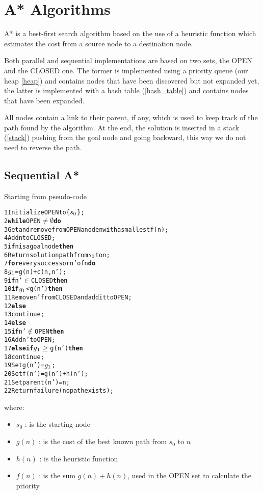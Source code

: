 \section{A* Algorithms}
\label{Sec:implementation}

A* is a best-first search algorithm based on the use of a heuristic function which estimates the cost from a source node to a destination node.

Both parallel and sequential implementations are based on two sets, the OPEN and the CLOSED one. The former is implemented using a priority queue (our heap \ref{heap}) and contains nodes that have been discovered but not expanded yet, the latter is implemented with a hash table (\ref{hash_table}) and contains nodes that have been expanded.

All nodes contain a link to their parent, if any, which is used to keep track of the path found by the algorithm. At the end, the solution is inserted in a stack (\ref{stack}) pushing from the goal node and going backward, this way we do not need to reverse the path.


\subsection{Sequential A*}

Starting from pseudo-code \cite{bibParAstar}

\begin{alltt}
    1 Initialize OPEN to \{\(s\sb{0}\)\};
    2 {\bf while} OPEN \(\neq\) \(\emptyset\) {\bf do}
    3    Get and remove from OPEN a node n with a smallest f(n);
    4    Add n to CLOSED;
    5   {\bf if} n is a goal node {\bf then}
    6       Return solution path from \(s\sb{0}\) to n;
    7   {\bf for} every successor n' of n {\bf do}
    8       \(g\sb{1}\) = g(n) + c(n, n');
    9      {\bf if} n' \(\in\) CLOSED {\bf then}
    10         {\bf if} \(g\sb{1}\) < g(n') {\bf then}
    11             Remove n' from CLOSED and add it to OPEN;
    12         {\bf else}
    13             continue;
    14     {\bf else}
    15         {\bf if} n' \(\notin\) OPEN {\bf then}
    16             Add n' to OPEN;
    17         {\bf else if} \(g\sb{1}\) \(\geq\) g(n') {\bf then}
    18             continue;
    19     Set g(n') = \(g\sb{1}\);
    20     Set f(n') = g(n') + h(n');
    21     Set parent(n') = n;
    22 Return failure (no path exists);
\end{alltt}

where:
\begin{itemize}
    \item $s_0$ : is the starting node
    \item $g(n)$ : is the cost of the best known path from $s_0$ to $n$
    \item $h(n)$ : is the heuristic function
    \item $f(n)$ : is the sum $g(n) + h(n)$, used in the OPEN set to calculate the priority
\end{itemize}


